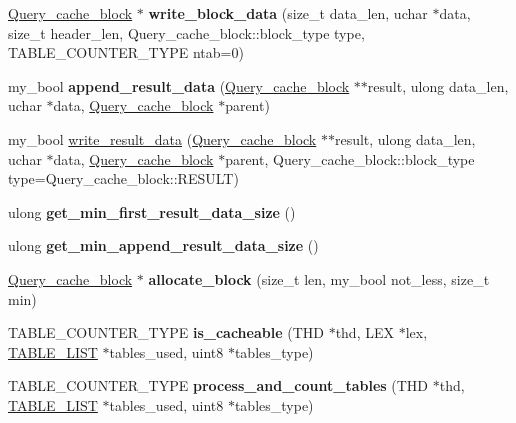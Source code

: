 \begin{DoxyCompactItemize}
\mbox{\label{classQuery__cache_abded68a376e3059397e33522d8ef27a4}} 
\mbox{\hyperlink{structQuery__cache__block}{Query\+\_\+cache\+\_\+block}} $\ast$ {\bfseries write\+\_\+block\+\_\+data} (size\+\_\+t data\+\_\+len, uchar $\ast$data, size\+\_\+t header\+\_\+len, Query\+\_\+cache\+\_\+block\+::block\+\_\+type type, T\+A\+B\+L\+E\+\_\+\+C\+O\+U\+N\+T\+E\+R\+\_\+\+T\+Y\+PE ntab=0)
\item 
\mbox{\label{classQuery__cache_a25f754a7f9f6529b9ac4d9b443953ff3}} 
my\+\_\+bool {\bfseries append\+\_\+result\+\_\+data} (\mbox{\hyperlink{structQuery__cache__block}{Query\+\_\+cache\+\_\+block}} $\ast$$\ast$result, ulong data\+\_\+len, uchar $\ast$data, \mbox{\hyperlink{structQuery__cache__block}{Query\+\_\+cache\+\_\+block}} $\ast$parent)
\item 
my\+\_\+bool \mbox{\hyperlink{classQuery__cache_a8c24cf21dfd267d54185e10696edc7b0}{write\+\_\+result\+\_\+data}} (\mbox{\hyperlink{structQuery__cache__block}{Query\+\_\+cache\+\_\+block}} $\ast$$\ast$result, ulong data\+\_\+len, uchar $\ast$data, \mbox{\hyperlink{structQuery__cache__block}{Query\+\_\+cache\+\_\+block}} $\ast$parent, Query\+\_\+cache\+\_\+block\+::block\+\_\+type type=Query\+\_\+cache\+\_\+block\+::\+R\+E\+S\+U\+LT)
\item 
\mbox{\label{classQuery__cache_aeaedf32ab95683a85b4d0c7c1d974d7e}} 
ulong {\bfseries get\+\_\+min\+\_\+first\+\_\+result\+\_\+data\+\_\+size} ()
\item 
\mbox{\label{classQuery__cache_a1c77ed6805d85edb120a013b36c998df}} 
ulong {\bfseries get\+\_\+min\+\_\+append\+\_\+result\+\_\+data\+\_\+size} ()
\item 
\mbox{\label{classQuery__cache_ae75540e410ef352c05a293dc0e83e885}} 
\mbox{\hyperlink{structQuery__cache__block}{Query\+\_\+cache\+\_\+block}} $\ast$ {\bfseries allocate\+\_\+block} (size\+\_\+t len, my\+\_\+bool not\+\_\+less, size\+\_\+t min)
\item 
\mbox{\label{classQuery__cache_a0d774063d818fc5862ef2f31d80a56c4}} 
T\+A\+B\+L\+E\+\_\+\+C\+O\+U\+N\+T\+E\+R\+\_\+\+T\+Y\+PE {\bfseries is\+\_\+cacheable} (T\+HD $\ast$thd, L\+EX $\ast$lex, \mbox{\hyperlink{structTABLE__LIST}{T\+A\+B\+L\+E\+\_\+\+L\+I\+ST}} $\ast$tables\+\_\+used, uint8 $\ast$tables\+\_\+type)
\item 
\mbox{\label{classQuery__cache_a8d96e787626046c489bcd5e57766d8d8}} 
T\+A\+B\+L\+E\+\_\+\+C\+O\+U\+N\+T\+E\+R\+\_\+\+T\+Y\+PE {\bfseries process\+\_\+and\+\_\+count\+\_\+tables} (T\+HD $\ast$thd, \mbox{\hyperlink{structTABLE__LIST}{T\+A\+B\+L\+E\+\_\+\+L\+I\+ST}} $\ast$tables\+\_\+used, uint8 $\ast$tables\+\_\+type)
\end{DoxyCompactItemize}
